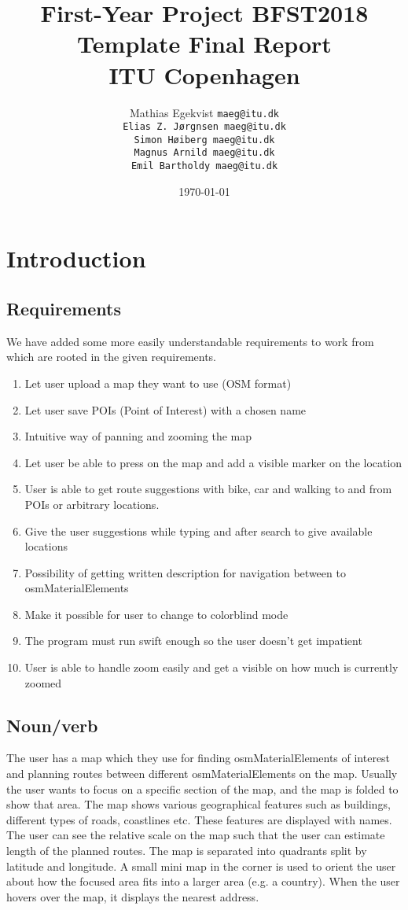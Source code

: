 \documentclass[11pt]{article}
\title{First-Year Project BFST2018\\Template Final Report\\ITU Copenhagen}
\author{Mathias Egekvist \tt{maeg@itu.dk}\\
Elias Z. Jørgnsen \tt{maeg@itu.dk}\\
Simon Høiberg \tt{maeg@itu.dk} \\
Magnus Arnild \tt{maeg@itu.dk} \\
Emil Bartholdy \tt{maeg@itu.dk}}
\date{\today}
\begin{document}
\maketitle

\section{Introduction}

\subsection{Requirements}

We have added some more easily understandable requirements to work from which are rooted in the given requirements.
\begin{enumerate}
  \item Let user upload a map they want to use (OSM format)
  \item Let user save POIs (Point of Interest) with a chosen name
  \item Intuitive way of panning and zooming the map
  \item Let user be able to press on the map and add a visible marker on the location
  \item User is able to get route suggestions with bike, car and walking to and from POIs or arbitrary locations.
  \item Give the user suggestions while typing and after search to give available locations
  \item Possibility of getting written description for navigation between to osmMaterialElements
  \item Make it possible for user to change to colorblind mode
  \item The program must run swift enough so the user doesn't get impatient
  \item User is able to handle zoom easily and get a visible on how much is currently zoomed


\end{enumerate}

\subsection{Noun/verb}
The user has a map which they use for finding osmMaterialElements of interest and planning routes between different osmMaterialElements on the map. Usually the user wants to focus on a specific section of the map, and the map is folded to show that area. The map shows various geographical features such as buildings, different types of roads, coastlines etc. These features are displayed with names. The user can see the relative scale on the map such that the user can estimate length of the planned routes. The map is separated into quadrants split by latitude and longitude. A small mini map in the corner is used to orient the user about how the focused area fits into a larger area (e.g. a country). When the user hovers over the map, it displays the nearest address.
\end{document}
